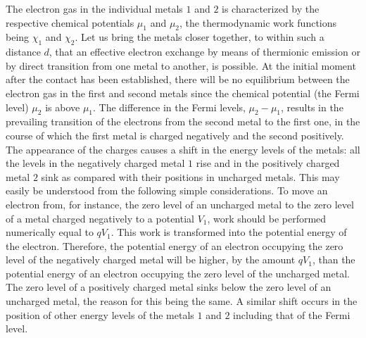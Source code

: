 The electron gas in the individual metals $1$ and $2$ is characterized by the respective chemical potentials $\mu_1$ and $\mu_2$, the thermodynamic work functions being $\chi_1$ and $\chi_2$. Let us bring the metals closer together, to within such a distance $d$, that an effective electron exchange by means of thermionic emission or by direct transition from one metal to another, is possible. At the initial moment after the contact has been established, there will be no equilibrium between the electron gas in the first and second metals since the chemical potential (the Fermi level) $\mu_2$ is above $\mu_1$. The difference in the Fermi levels, $\mu_2-\mu_1$, results in the prevailing transition of the electrons from the second metal to the first one, in the course of which the first metal is charged negatively and the second positively. The appearance of the charges causes a shift in the energy levels of the metals: all the levels in the negatively charged metal $1$ rise and in the positively charged metal $2$ sink as compared with their positions in uncharged metals. This may easily be understood from the following simple considerations. To move an electron from, for instance, the zero level of an uncharged metal to the zero level of a metal charged negatively to a potential $V_1$, work should be performed numerically equal to $qV_1$. This work is transformed into the potential energy of the electron. Therefore, the potential energy of an electron occupying the zero level of the negatively charged metal will be higher, by the amount $qV_1$, than the potential energy of an electron occupying the zero level of the uncharged metal. The zero level of a positively charged metal sinks below the zero level of an uncharged metal, the reason for this being the same. A similar shift occurs in the position of other energy levels of the metals $1$ and $2$ including that of the Fermi level.

